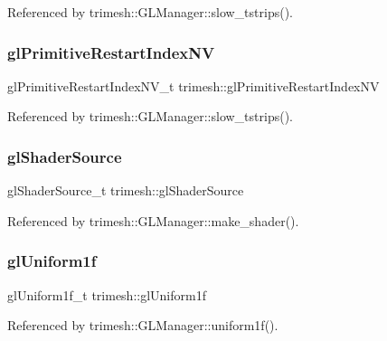Referenced by trimesh\+::\+G\+L\+Manager\+::slow\+\_\+tstrips().

\mbox{\label{namespacetrimesh_a44c58825ddfe4b914854d57167946bbc}} 
\subsubsection{\texorpdfstring{gl\+Primitive\+Restart\+Index\+NV}{glPrimitiveRestartIndexNV}}
{\footnotesize\ttfamily gl\+Primitive\+Restart\+Index\+N\+V\+\_\+t trimesh\+::gl\+Primitive\+Restart\+Index\+NV\hspace{0.3cm}{\ttfamily [static]}}



Referenced by trimesh\+::\+G\+L\+Manager\+::slow\+\_\+tstrips().

\mbox{\label{namespacetrimesh_abe6c06e4d809a141322902265461d9a0}} 
\subsubsection{\texorpdfstring{gl\+Shader\+Source}{glShaderSource}}
{\footnotesize\ttfamily gl\+Shader\+Source\+\_\+t trimesh\+::gl\+Shader\+Source\hspace{0.3cm}{\ttfamily [static]}}



Referenced by trimesh\+::\+G\+L\+Manager\+::make\+\_\+shader().

\mbox{\label{namespacetrimesh_a182bd4e8bcaba88023ceb95977d2ed44}} 
\subsubsection{\texorpdfstring{gl\+Uniform1f}{glUniform1f}}
{\footnotesize\ttfamily gl\+Uniform1f\+\_\+t trimesh\+::gl\+Uniform1f\hspace{0.3cm}{\ttfamily [static]}}



Referenced by trimesh\+::\+G\+L\+Manager\+::uniform1f().

